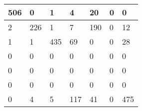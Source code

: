 \begin{tabular}{lllllll}
\hline
  506 & 0 & 1 & 4 & 20 & 0 & 0 \\
\hline
  2 & 226 & 1 & 7 & 190 & 0 & 12 \\
\hline
  1 & 1 & 435 & 69 & 0 & 0 & 28 \\
\hline
  0 & 0 & 0 & 0 & 0 & 0 & 0 \\
\hline
  0 & 0 & 0 & 0 & 0 & 0 & 0 \\
\hline
  0 & 0 & 0 & 0 & 0 & 0 & 0 \\
\hline
  0 & 4 & 5 & 117 & 41 & 0 & 475 \\
\hline
\end{tabular}
